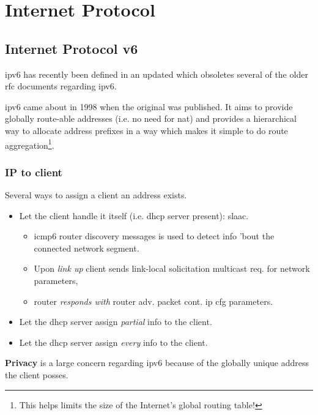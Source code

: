 \chapter[IP]{Internet Protocol}

\section[IPv6]{Internet Protocol v6}

\gls{ipv6} has recently been defined in an updated  which obsoletes several of the older \gls{rfc} documents regarding \gls{ipv6}.

\gls{ipv6} came about in 1998 when the original  was published. It aims to provide globally route-able addresses (i.e. no need for \gls{nat}) and provides a hierarchical way to allocate address prefixes in a way which makes it simple to do route aggregation\footnote{This helps limits the size of the Internet's global routing table!}.


\subsection{IP to client}

Several ways to assign a client an address exists.
\begin{itemize}
    \item Let the client handle it itself (i.e. \gls{dhcp} server present): \gls{slaac}.
    \begin{itemize}
        \item \gls{icmp6} router discovery messages is used to detect info 'bout the connected network segment.
        \item Upon \textit{link up} client sends link-local solicitation multicast req. for network parameters,
        \item router \textit{responds with}  router adv. packet cont. \gls{ip} cfg parameters.
    \end{itemize}
    \item Let the \gls{dhcp} server assign \textit{partial} info to the client.
    \item Let the \gls{dhcp} server assign \textit{every} info to the client.
\end{itemize}

\textbf{Privacy} is a large concern regarding \gls{ipv6} because of the globally unique address the client posses.

